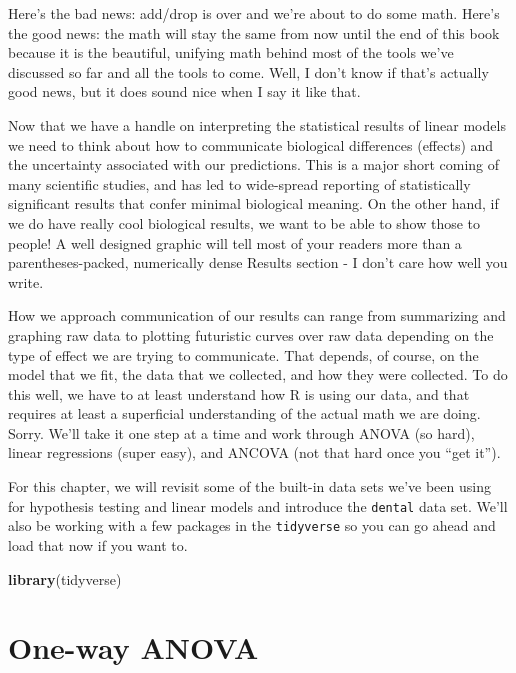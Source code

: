 \documentclass[
]{book}
\newenvironment{Shaded}{\begin{snugshade}}{\end{snugshade}}
\newcommand{\KeywordTok}[1]{\textcolor[rgb]{0.13,0.29,0.53}{\textbf{#1}}}
\newcommand{\NormalTok}[1]{#1}
\begin{document}
Here's the bad news: add/drop is over and we're about to do some math. Here's the good news: the math will stay the same from now until the end of this book because it is the beautiful, unifying math behind most of the tools we've discussed so far and all the tools to come. Well, I don't know if that's actually good news, but it does sound nice when I say it like that.

Now that we have a handle on interpreting the statistical results of linear models we need to think about how to communicate biological differences (effects) and the uncertainty associated with our predictions. This is a major short coming of many scientific studies, and has led to wide-spread reporting of statistically significant results that confer minimal biological meaning. On the other hand, if we do have really cool biological results, we want to be able to show those to people! A well designed graphic will tell most of your readers more than a parentheses-packed, numerically dense Results section - I don't care how well you write.

How we approach communication of our results can range from summarizing and graphing raw data to plotting futuristic curves over raw data depending on the type of effect we are trying to communicate. That depends, of course, on the model that we fit, the data that we collected, and how they were collected. To do this well, we have to at least understand how R is using our data, and that requires at least a superficial understanding of the actual math we are doing. Sorry. We'll take it one step at a time and work through ANOVA (so hard), linear regressions (super easy), and ANCOVA (not that hard once you ``get it'').

For this chapter, we will revisit some of the built-in data sets we've been using for hypothesis testing and linear models and introduce the \texttt{dental} data set. We'll also be working with a few packages in the \texttt{tidyverse} so you can go ahead and load that now if you want to.

\begin{Shaded}
\begin{Highlighting}[]
\KeywordTok{library}\NormalTok{(tidyverse)}
\end{Highlighting}
\end{Shaded}

\hypertarget{one-way-anova}{%
\section{One-way ANOVA}\label{one-way-anova}}
\end{document}
